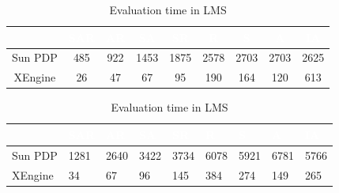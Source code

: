 \begin{table}[t]
\centering
\begin{tabular}{|>{\tiny}c|>{\tiny}c|>{\tiny}c|>{\tiny}c|>{\tiny}c|>{\tiny}c|>{\tiny}c|>{\tiny}c|>{\tiny}c|}   
\hline  \rowcolor{black} \scriptsize \bf \textcolor {white}{}
& \scriptsize \bf \textcolor {white}{SAR}
& \scriptsize \bf \textcolor {white}{AR}
& \scriptsize \bf \textcolor  {white}{SA}
& \scriptsize \bf \textcolor  {white}{SR}
& \scriptsize \bf \textcolor  {white}{R}
& \scriptsize \bf \textcolor  {white}{S} 
& \scriptsize \bf \textcolor  {white}{A}
& \scriptsize \bf \textcolor {white}{IA}\\ \hline
\scriptsize  {Sun PDP }
&\scriptsize  {485}
& \scriptsize {922}
& \scriptsize {1453}
& \scriptsize {1875}
& \scriptsize {2578}
& \scriptsize {2703}
& \scriptsize {2703}
& \scriptsize {2625}
  \\ \hline
\scriptsize  {XEngine}
&\scriptsize  {26}
& \scriptsize {47}
& \scriptsize {67}
& \scriptsize {95}
& \scriptsize {190}
& \scriptsize {164}
& \scriptsize {120}
& \scriptsize {613}
  \\ \hline
\end{tabular}

\caption{Evaluation time in LMS}
\label{table:LMSeval}
\vspace{5 mm}
\centering
\begin{tabular}{|l|l|l|l|l|l|l|l|l|}   
\hline  \rowcolor{black} \scriptsize \bf \textcolor {white}{}
& \scriptsize \bf \textcolor {white}{SAR}
& \scriptsize \bf \textcolor {white}{AR}
& \scriptsize \bf \textcolor  {white}{SA}
& \scriptsize \bf \textcolor  {white}{SR}
& \scriptsize \bf \textcolor  {white}{R}
& \scriptsize \bf \textcolor  {white}{S} 
& \scriptsize \bf \textcolor  {white}{A}
& \scriptsize \bf \textcolor {white}{IA}\\ \hline
\scriptsize  {Sun PDP }
& \scriptsize  {1281}
& \scriptsize {2640}
& \scriptsize {3422}
& \scriptsize {3734}
& \scriptsize {6078}
& \scriptsize {5921}
& \scriptsize {6781}
& \scriptsize {5766}
  \\ \hline
\scriptsize  {XEngine}
& \scriptsize  {34}
& \scriptsize {67}
& \scriptsize {96}
& \scriptsize {145}
& \scriptsize {384}
& \scriptsize {274}
& \scriptsize {149}
& \scriptsize {265}
  \\ \hline
\end{tabular}


\end{table}
